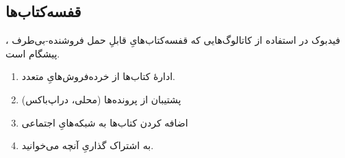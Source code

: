 \documentclass[]{article}
\begin{document}
\subsection{قفسه‌کتاب‌ها}
فیدبوک در استفاده از کاتالوگ‌هایی که قفسه‌کتاب‌هایِ قابلِ حمل فروشنده-بی‌طرف
، پیشگام است.
\begin{enumerate}
	\item ادارهٔ کتاب‌ها از خرده‌فروش‌هایِ متعدد.
	\item پشتیبان از پرونده‌ها (محلی، دراپ‌باکس)
	\item اضافه کردن کتاب‌ها به شبکه‌هایِ اجتماعی
	\item به اشتراک گذاریِ آنچه می‌خوانید.
\end{enumerate}

\end{document}
